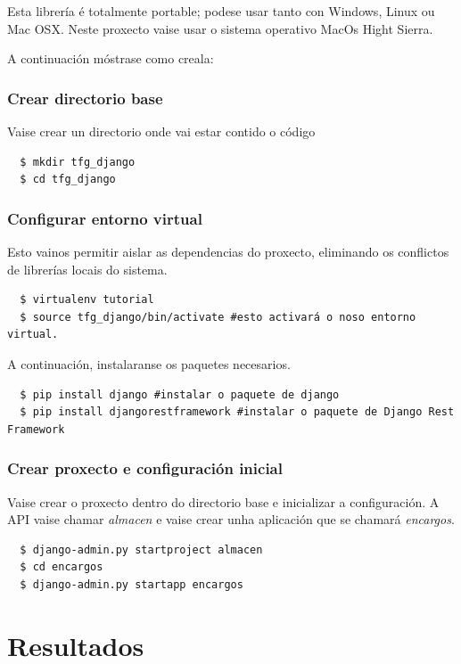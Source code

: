 \documentclass[11pt,twoside]{book}
\begin{document}
Esta librería é totalmente portable; podese usar tanto con Windows, Linux ou Mac OSX. Neste proxecto vaise usar o sistema operativo MacOs Hight Sierra.

A continuación móstrase como creala:

\subsection{Crear directorio base}

Vaise crear un directorio onde vai estar contido o código

\begin{verbatim}
  $ mkdir tfg_django
  $ cd tfg_django
\end{verbatim}

\subsection{Configurar entorno virtual}

Esto vainos permitir aislar as dependencias do proxecto, eliminando os conflictos de librerías locais do sistema.
\begin{verbatim}
  $ virtualenv tutorial
  $ source tfg_django/bin/activate #esto activará o noso entorno virtual.
\end{verbatim}

A continuación, instalaranse os paquetes necesarios.

\begin{verbatim}
  $ pip install django #instalar o paquete de django
  $ pip install djangorestframework #instalar o paquete de Django Rest Framework
\end{verbatim}

\subsection{Crear proxecto e configuración inicial}

Vaise crear o proxecto dentro do directorio base e inicializar a configuración. A API vaise chamar \textit{almacen} e vaise crear unha aplicación que se chamará \textit{encargos}.

\begin{verbatim}
  $ django-admin.py startproject almacen
  $ cd encargos
  $ django-admin.py startapp encargos
\end{verbatim}


\chapter{Resultados}
\end{document}
